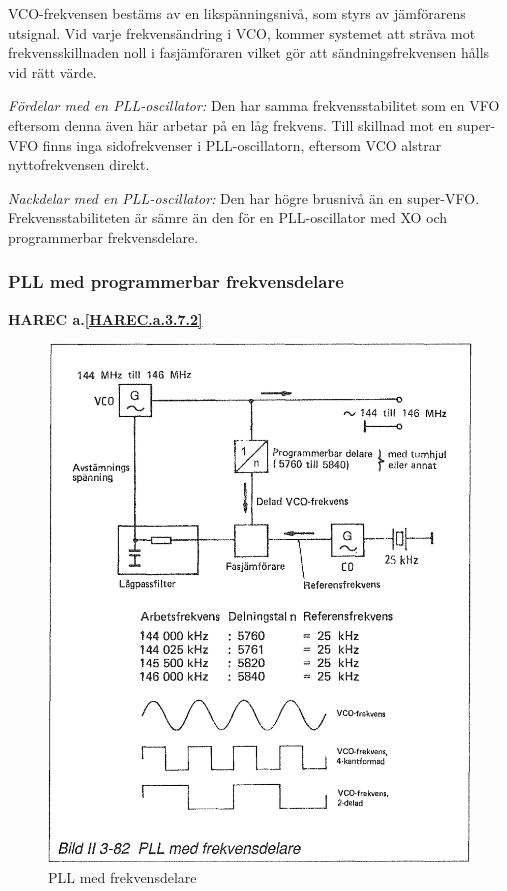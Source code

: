 VCO-frekvensen bestäms av en likspänningsnivå, som styrs av
jämförarens utsignal. Vid varje frekvensändring i VCO, kommer systemet
att sträva mot frekvensskillnaden noll i fasjämföraren vilket gör att
sändningsfrekvensen hålls vid rätt värde.

\emph{Fördelar med en PLL-oscillator:} Den har samma frekvensstabilitet som
en VFO eftersom denna även här arbetar på en låg frekvens. Till
skillnad mot en super-VFO finns inga sidofrekvenser i PLL-oscillatorn,
eftersom VCO alstrar nyttofrekvensen direkt.

\emph{Nackdelar med en PLL-oscillator:} Den har högre brusnivå än en
super-VFO. Frekvensstabiliteten är sämre än den för en PLL-oscillator
med XO och programmerbar frekvensdelare.

\subsubsection{PLL med programmerbar frekvensdelare}
\textbf{HAREC a.\ref{HAREC.a.3.7.2}\label{myHAREC.a.3.7.2}}

\begin{figure}
\includegraphics[width=\textwidth]{images/bild_2_3-82}
\caption{PLL med frekvensdelare}
\label{fig:BildII3-82}
\end{figure}

